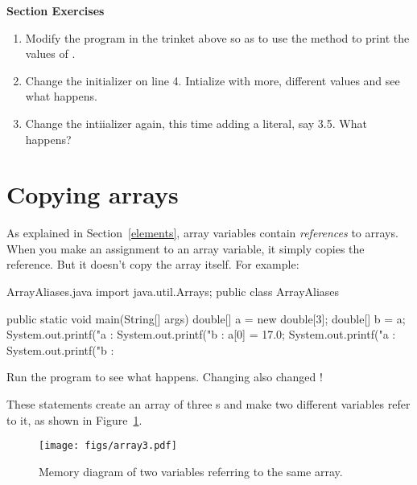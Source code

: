 \textbf{Section Exercises}
\begin{enumerate}
\item Modify the  program in the trinket above so as to use the  method to print the values of .
\item Change the initializer on line 4.  Intialize with more, different values and see what happens.
\item Change the intiializer again, this time adding a  literal, say 3.5.  What happens?
\end{enumerate}


\section{Copying arrays}


As explained in Section~\ref{elements}, array variables contain {\em references} to arrays.
When you make an assignment to an array variable, it simply copies the reference.
But it doesn't copy the array itself.
For example:

\begin{trinket} [250] {ArrayAliases.java}
import java.util.Arrays;
public class ArrayAliases {

    public static void main(String[] args) {
       double[] a = new double[3];
       double[] b = a;
       System.out.printf("a : %
       System.out.printf("b : %
       a[0] = 17.0;
       System.out.printf("a : %
       System.out.printf("b : %
    }
}
\end{trinket}

Run the program to see what happens.  Changing  also changed !

These statements create an array of three s and make two different variables refer to it, as shown in Figure~\ref{fig.array3}.


\begin{figure}[!ht]
\begin{center}
\texttt{[image: figs/array3.pdf]}
\caption{Memory diagram of two variables referring to the same array.}
\label{fig.array3}
\end{center}
\end{figure}

